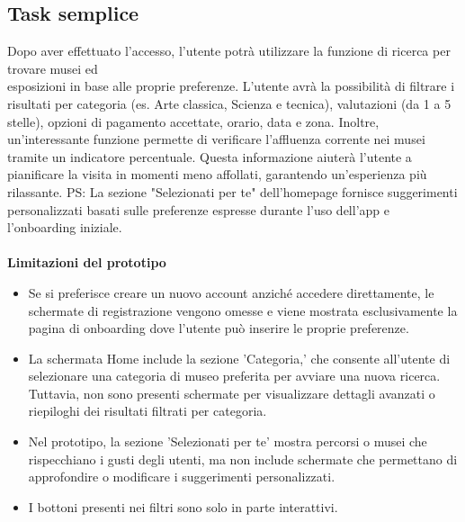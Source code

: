 \documentclass{article}
\begin{document}
\subsection{Task semplice}
Dopo aver effettuato l'accesso, l'utente potrà utilizzare la funzione di ricerca per trovare musei ed \\ esposizioni in base alle proprie preferenze. L'utente avrà la possibilità di filtrare i risultati per categoria (es. Arte classica, Scienza e tecnica), valutazioni (da 1 a 5 stelle), opzioni di pagamento accettate, orario, data e zona. Inoltre, un'interessante funzione permette di verificare l'affluenza corrente nei musei tramite un indicatore percentuale. Questa informazione aiuterà l'utente a pianificare la visita in momenti meno affollati, garantendo un'esperienza più rilassante.
PS: La sezione "Selezionati per te" dell’homepage fornisce suggerimenti personalizzati basati sulle preferenze espresse durante l'uso dell'app e l’onboarding iniziale. \\
\\
\textbf{Limitazioni del prototipo}
\begin{itemize}
\item Se si preferisce creare un nuovo account anziché accedere direttamente, le schermate di registrazione vengono omesse e viene mostrata esclusivamente la pagina di onboarding dove l'utente può inserire le proprie preferenze.
\item La schermata Home include la sezione 'Categoria,' che consente all’utente di selezionare una categoria di museo preferita per avviare una nuova ricerca. Tuttavia, non sono presenti schermate per visualizzare dettagli avanzati o riepiloghi dei risultati filtrati per categoria.
\item Nel prototipo, la sezione 'Selezionati per te' mostra percorsi o musei che rispecchiano i gusti degli utenti, ma non include schermate che permettano di approfondire o modificare i suggerimenti personalizzati.
\item I bottoni presenti nei filtri sono solo in parte interattivi.
\end{itemize}
\end{document}
